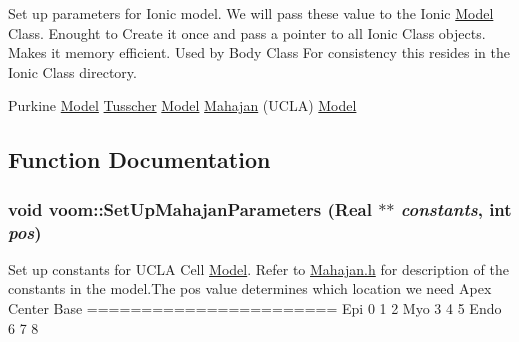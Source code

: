 Set up parameters for Ionic model. We will pass these value to the Ionic \hyperlink{classvoom_1_1_model}{Model} Class. Enought to Create it once and pass a pointer to all Ionic Class objects. Makes it memory efficient. Used by Body Class For consistency this resides in the Ionic Class directory.

Purkine \hyperlink{classvoom_1_1_model}{Model} \hyperlink{classvoom_1_1_tusscher}{Tusscher} \hyperlink{classvoom_1_1_model}{Model} \hyperlink{classvoom_1_1_mahajan}{Mahajan} (UCLA) \hyperlink{classvoom_1_1_model}{Model} 

\subsection{Function Documentation}
\hypertarget{namespacevoom_a72a608e668a052d7b2a6f26a6e286702}{
\subsubsection[{SetUpMahajanParameters}]{\setlength{\rightskip}{0pt plus 5cm}void voom::SetUpMahajanParameters (Real $\ast$$\ast$ {\em constants}, \/  int {\em pos})}}
\label{namespacevoom_a72a608e668a052d7b2a6f26a6e286702}
Set up constants for UCLA Cell \hyperlink{classvoom_1_1_model}{Model}. Refer to \hyperlink{_mahajan_8h_source}{Mahajan.h} for description of the constants in the model.The pos value determines which location we need Apex Center Base ======================= Epi 0 1 2 Myo 3 4 5 Endo 6 7 8 